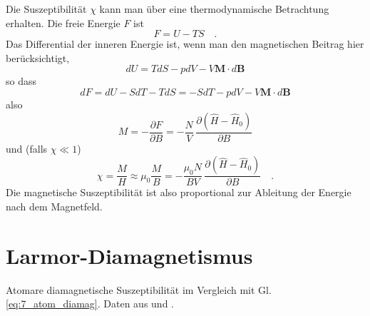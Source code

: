 Die Suszeptibilität $\chi$ kann man über eine thermodynamische Betrachtung erhalten. Die freie Energie $F$ ist
\begin{equation}
    F = U - T S \quad .
\end{equation}
Das Differential der inneren Energie ist, wenn man den magnetischen Beitrag hier berücksichtigt,
\begin{equation}
    dU = T dS - p dV - V \bm{M}\cdot d \bm{B}
\end{equation}
so dass
\begin{equation}
    dF = dU - S dT - T dS = -S dT - p dV - V \bm{M}\cdot d \bm{B}
\end{equation}
also 
\begin{equation}
    M  = - \frac{\partial F}{\partial B} = - \frac{N}{V} \, \frac{\partial (\hat{H} - \hat{H}_0)}{\partial B}
\end{equation}
und (falls $\chi \ll 1$)
\begin{equation}
    \chi = \frac{M}{H} \approx \mu_0 \frac{M}{B} = - \frac{\mu_0 N}{B V} \, \frac{\partial (\hat{H} - \hat{H}_0)}{\partial B} \quad .
\end{equation}
Die magnetische Suszeptibilität ist also proportional zur Ableitung der Energie nach dem Magnetfeld. 

\section*{Larmor-Diamagnetismus}


\begin{marginfigure}
    \caption{Atomare diamagnetische Suszeptibilität im Vergleich mit Gl. \ref{eq:7_atom_diamag}. Daten aus \cite{Gross_FK} und \cite{Blundell_magnetism}.
    }
\end{marginfigure}
    

